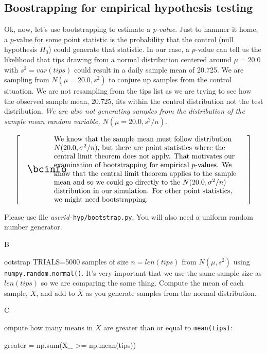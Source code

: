 \documentclass[titlepage]{tufte-book}
\makeatletter
\newcounter{problem}
\newcommand{\step}[1]{{}
\vspace{4pt} \noindent {\bf \theproblem. }#1\addtocounter{problem}{1}}
\newenvironment{callout}[1]{
\[
  \left[
      \begin{tabular}{@{\quad}m{.05\textwidth}@{\qquad}m{.75\textwidth}@{\quad}}
        \scalebox{1.5}{#1} & 
          \raggedright%
}
{
      \end{tabular}
    \right]
\]
}
\makeatother
\begin{document}
\begin{fullwidth}
\subsection{Boostrapping for empirical hypothesis testing}

\setcounter{problem}{1}

Ok, now, let's use bootstrapping to estimate a {\em p-value}.  Just to hammer it home, a $p$-value for some point statistic is the probability that the control (null hypothesis $H_0$) could generate that statistic. In our case, a $p$-value can tell us the likelihood that tips drawing from a normal distribution centered around $\mu=20.0$ with $s^2=var(tips)$ could result in a daily sample mean of 20.725. We are sampling from $N(\mu=20.0,s^2)$ to conjure up samples from the control situation. We are not resampling from the tips list as we are trying to see how the observed sample mean, 20.725, fits within the control distribution not the test distribution. {\em We are also not generating samples from the distribution of the sample mean random variable, $N(\mu=20.0,s^2/n)$}.

\begin{callout}{\bcinfo}
We know that the sample mean must follow distribution $N(20.0, \sigma^2/n)$, but there are point statistics where the central limit theorem does not apply. That motivates our examination of bootstrapping for empirical $p$-values.  We know that the central limit theorem applies to the sample mean and so we could go directly to the $N(20.0, \sigma^2/n)$ distribution in our simulation.  For other point statistics, we might need bootstrapping.
\end{callout}


\noindent Please use file {\em userid}{\tt -hyp/bootstrap.py}. You will also need a uniform random number generator. 

\step Bootstrap TRIALS=5000 samples of size $n=len(tips)$ from $N(\mu, s^2)$ using {\tt numpy.random.normal()}. It's very important that we use the same sample size as $len(tips)$ so we are comparing the same thing. Compute the mean of each sample, $X$, and add to $\overline{X}$ as you generate samples from the normal distribution.

\step Compute how many means in $\overline{X}$ are greater than or equal to {\tt mean(tips)}:

\begin{pyverbatim}
greater = np.sum(X_ >= np.mean(tips))
\end{pyverbatim}


\end{fullwidth}
\end{document}
